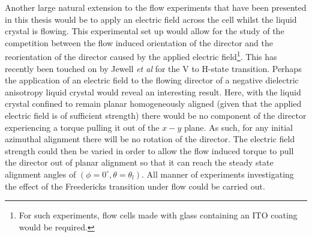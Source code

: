 Another large natural extension to the flow experiments that have been presented in this thesis would be to apply an electric field across the cell whilst the liquid crystal is flowing. This experimental set up would allow for the study of the competition between the flow induced orientation of the director and the reorientation of the director caused by the applied electric field\footnote{For such experiments, flow cells made with glass containing an ITO coating would be required.}. This has recently been touched on by Jewell \textit{et al} \cite{Jewell2008} for the V to H-state transition. Perhaps the application of an electric field to the flowing director of a negative dielectric anisotropy liquid crystal would reveal an interesting result. Here, with the liquid crystal confined to remain planar homogeneously aligned (given that the applied electric field is of sufficient strength) there would be no component of the director experiencing a torque pulling it out of the $x-y$ plane. As such, for any initial azimuthal alignment there will be no rotation of the director. The electric field strength could then be varied in order to allow the flow induced torque to pull the director out of planar alignment so that it can reach the steady state alignment angles of $\left(\phi=0^{\circ},\theta=\theta_l\right)$. All manner of experiments investigating the effect of the Freedericks transition under flow could be carried out.

